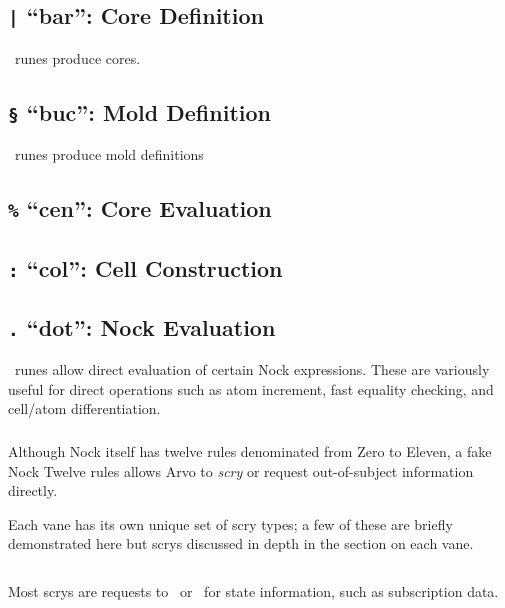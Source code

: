 \subsection{\texttt{|} “bar”:  Core Definition}

\pbar~runes produce cores.

\subsection{\texttt{\S} “buc”:  Mold Definition}

\pbuc~runes produce mold definitions

\subsection{\texttt{\%} “cen”:  Core Evaluation}

\subsection{\texttt{:} “col”:  Cell Construction}

\subsection{\texttt{.} “dot”:  Nock Evaluation}

\pdot~runes allow direct evaluation of certain Nock expressions.  These are variously useful for direct operations such as atom increment, fast equality checking, and cell/atom differentiation.

\subsubsection{\pdotket}

Although Nock itself has twelve rules denominated from Zero to Eleven, a fake Nock Twelve rules allows Arvo to \emph{scry} or request out-of-subject information directly.

Each vane has its own unique set of scry types; a few of these are briefly demonstrated here but scrys discussed in depth in the section on each vane.

\begin{lstlisting}

\end{lstlisting}

Most scrys are requests to \clay~or \gall~for state information, such as subscription data.


